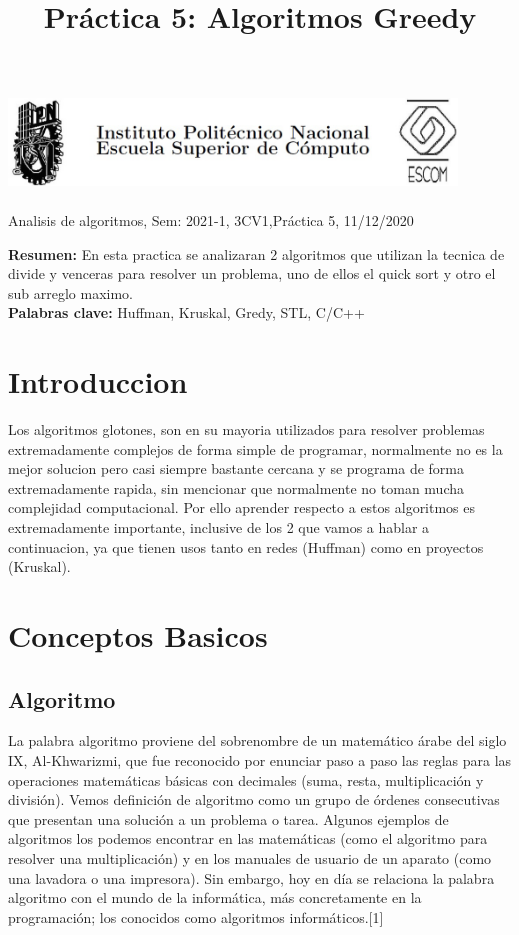\documentclass[spanish]{article}
\title {Práctica 5: Algoritmos Greedy}
\begin{document}
	\centerline{\includegraphics[width=450px,height=100px]{header}}
	\centerline{Analisis de algoritmos, Sem: 2021-1, 3CV1,Práctica  5, 11/12/2020}
	\centerline{}
	\bigskip
	\justify
	\textbf{Resumen:}	
	En esta practica se analizaran 2 algoritmos que utilizan la tecnica de divide y venceras para resolver un problema, uno de ellos el quick sort y otro el sub arreglo maximo.\\
	\textbf{Palabras clave:}
	Huffman, Kruskal, Gredy, STL, C/C++
	\section{Introduccion}
	Los algoritmos glotones, son en su mayoria utilizados para resolver problemas extremadamente complejos de forma simple de programar, normalmente no es la mejor solucion pero casi siempre bastante cercana y se programa de forma extremadamente rapida, sin mencionar que normalmente no toman mucha complejidad computacional.
	Por ello aprender respecto a estos algoritmos es extremadamente importante, inclusive de los 2 que vamos a hablar a continuacion, ya que tienen usos tanto en redes (Huffman) como en proyectos (Kruskal).
	\section{Conceptos Basicos}
	\subsection{Algoritmo}
		La palabra algoritmo proviene del sobrenombre de un matemático árabe del siglo IX, Al-Khwarizmi, que fue reconocido por enunciar paso a paso las reglas para las operaciones matemáticas básicas con decimales (suma, resta, multiplicación y división).	
		Vemos definición de algoritmo como un grupo de órdenes consecutivas que presentan una solución a un problema o tarea. Algunos ejemplos de algoritmos los podemos encontrar en las matemáticas (como el algoritmo para resolver una multiplicación) y en los manuales de usuario de un aparato (como una lavadora o una impresora).	
		Sin embargo, hoy en día se relaciona la palabra algoritmo con el mundo de la informática, más concretamente en la programación; los conocidos como algoritmos informáticos.[1]
\end{document}
